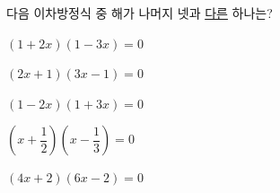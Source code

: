 다음 이차방정식 중 해가 나머지 넷과 \underline{다른} 하나는?
\begin{choicesii}{\rule[-3ex]{0pt}{8ex}$(1+2x)(1-3x)=0$}{\rule[-3ex]{0pt}{8ex}$(2x+1)(3x-1)=0$}{\rule[-3ex]{0pt}{8ex}$(1-2x)(1+3x)=0$}{\rule[-3ex]{0pt}{8ex}$\left(x+\dfrac{1}{2}\right)\left(x-\dfrac{1}{3}\right)=0$}{\rule[-3ex]{0pt}{8ex}$(4x+2)(6x-2)=0$}\end{choicesii}
